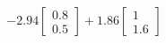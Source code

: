 \documentclass[preview]{standalone}
\begin{document}
\begin{align*}
-2.94 \begin{bmatrix} 0.8 \\ 0.5 \end{bmatrix} + 1.86 \begin{bmatrix} 1 \\ 1.6 \end{bmatrix}
\end{align*}
\end{document}
